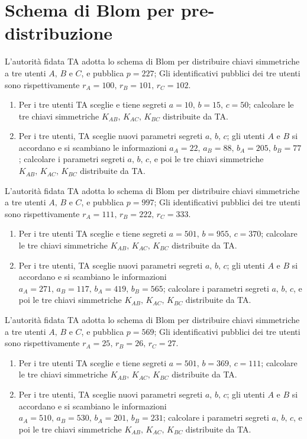     \section{Schema di Blom per pre-distribuzione}
        L'autorità fidata TA adotta lo schema di Blom per distribuire chiavi simmetriche a tre utenti $A,\,B$ e $C$, 
        e pubblica $p=227$; Gli identificativi pubblici dei tre utenti sono rispettivamente  $r_A=100,\, r_B=101,\, r_C=102$.
        \begin{enumerate}
            \item Per i tre utenti TA sceglie e tiene segreti $a=10,\,b=15,\,c=50$; calcolare le tre chiavi simmetriche 
                $K_{AB},\, K_{AC},\, K_{BC}$ distribuite da TA.
            \item Per i tre utenti, TA sceglie nuovi parametri segreti $a,\,b,\,c$; gli utenti $A$ e $B$ si accordano 
                e si scambiano le informazioni $a_A=22,\, a_B=88,\, b_A=205,\, b_B=77$; calcolare i parametri segreti 
                $a,\,b,\,c$, e poi le tre chiavi simmetriche $K_{AB},\, K_{AC},\, K_{BC}$ distribuite da TA.
        \end{enumerate}

        L'autorità fidata TA adotta lo schema di Blom per distribuire chiavi simmetriche a tre utenti $A,\,B$ e $C$, 
        e pubblica $p=997$; Gli identificativi pubblici dei tre utenti sono rispettivamente  $r_A=111,\, r_B=222,\, r_C=333$.
        \begin{enumerate}
            \item Per i tre utenti TA sceglie e tiene segreti $a=501,\,b=955,\,c=370$; calcolare le tre chiavi simmetriche 
                $K_{AB},\, K_{AC},\, K_{BC}$ distribuite da TA.
            \item Per i tre utenti, TA sceglie nuovi parametri segreti $a,\,b,\,c$; gli utenti $A$ e $B$ si accordano 
                e si scambiano le informazioni $a_A=271,\, a_B=117,\, b_A=419,\, b_B=565$; calcolare i parametri segreti 
                $a,\,b,\,c$, e poi le tre chiavi simmetriche $K_{AB},\, K_{AC},\, K_{BC}$ distribuite da TA.
        \end{enumerate}

        L'autorità fidata TA adotta lo schema di Blom per distribuire chiavi simmetriche a tre utenti $A,\,B$ e $C$, 
        e pubblica $p=569$; Gli identificativi pubblici dei tre utenti sono rispettivamente  $r_A=25,\, r_B=26,\, r_C=27$.
        \begin{enumerate}
            \item Per i tre utenti TA sceglie e tiene segreti $a=501,\,b=369,\,c=111$; calcolare le tre chiavi simmetriche 
                $K_{AB},\, K_{AC},\, K_{BC}$ distribuite da TA.
            \item Per i tre utenti, TA sceglie nuovi parametri segreti $a,\,b,\,c$; gli utenti $A$ e $B$ si accordano 
                e si scambiano le informazioni $a_A=510,\, a_B=530,\, b_A=201,\, b_B=231$; calcolare i parametri segreti 
                $a,\,b,\,c$, e poi le tre chiavi simmetriche $K_{AB},\, K_{AC},\, K_{BC}$ distribuite da TA.
        \end{enumerate}

